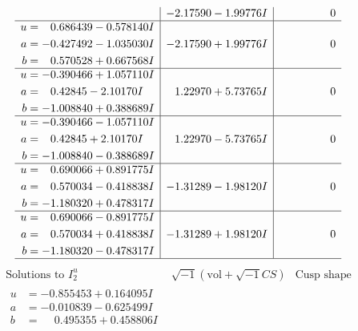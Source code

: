 \documentclass[1p]{elsarticle_modified}
\theoremstyle{definition}
\newcommand{\I}{\sqrt{-1}}
\begin{document}
$$\begin{array}{c|c|c}
 & -2.17590 - 1.99776 I & \phantom{-0.000000 } 0 \\ \hline\begin{aligned}
u &= \phantom{-}0.686439 - 0.578140 I \\
a &= -0.427492 - 1.035030 I \\
b &= \phantom{-}0.570528 + 0.667568 I\end{aligned}
 & -2.17590 + 1.99776 I & \phantom{-0.000000 } 0 \\ \hline\begin{aligned}
u &= -0.390466 + 1.057110 I \\
a &= \phantom{-}0.42845 - 2.10170 I \\
b &= -1.008840 + 0.388689 I\end{aligned}
 & \phantom{-}1.22970 + 5.73765 I & \phantom{-0.000000 } 0 \\ \hline\begin{aligned}
u &= -0.390466 - 1.057110 I \\
a &= \phantom{-}0.42845 + 2.10170 I \\
b &= -1.008840 - 0.388689 I\end{aligned}
 & \phantom{-}1.22970 - 5.73765 I & \phantom{-0.000000 } 0 \\ \hline\begin{aligned}
u &= \phantom{-}0.690066 + 0.891775 I \\
a &= \phantom{-}0.570034 - 0.418838 I \\
b &= -1.180320 + 0.478317 I\end{aligned}
 & -1.31289 - 1.98120 I & \phantom{-0.000000 } 0 \\ \hline\begin{aligned}
u &= \phantom{-}0.690066 - 0.891775 I \\
a &= \phantom{-}0.570034 + 0.418838 I \\
b &= -1.180320 - 0.478317 I\end{aligned}
 & -1.31289 + 1.98120 I & \phantom{-0.000000 } 0\\
 \hline 
 \end{array}$$\newpage$$\begin{array}{c|c|c}  
\text{Solutions to }I^u_{2}& \I (\text{vol} + \sqrt{-1}CS) & \text{Cusp shape}\\
 \hline 
\begin{aligned}
u &= -0.855453 + 0.164095 I \\
a &= -0.010839 - 0.625499 I \\
b &= \phantom{-}0.495355 + 0.458806 I\end{aligned}

\end{array}$$
\end{document}
